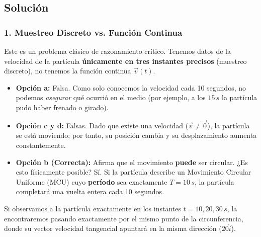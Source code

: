 \documentclass[12pt, a4paper]{article}
\begin{document}
\subsection*{Solución}

\subsubsection*{1. Muestreo Discreto vs. Función Continua}
Este es un problema clásico de razonamiento crítico. Tenemos datos de la velocidad de la partícula \textbf{únicamente en tres instantes precisos} (muestreo discreto), no tenemos la función continua $\vec{v}(t)$.

\begin{itemize}
    \item \textbf{Opción a:} Falsa. Como solo conocemos la velocidad cada 10 segundos, no podemos \textit{asegurar} qué ocurrió en el medio (por ejemplo, a los $15\,\si{s}$ la partícula pudo haber frenado o girado).
    \item \textbf{Opción c y d:} Falsas. Dado que existe una velocidad ($\vec{v} \neq \vec{0}$), la partícula se está moviendo; por tanto, su posición cambia y su desplazamiento aumenta constantemente.
    \item \textbf{Opción b (Correcta):} Afirma que el movimiento \textbf{puede} ser circular. ¿Es esto físicamente posible? Sí. Si la partícula describe un Movimiento Circular Uniforme (MCU) cuyo \textbf{período} sea exactamente $T = 10\,\si{s}$, la partícula completará una vuelta entera cada 10 segundos. 
\end{itemize}

Si observamos a la partícula exactamente en los instantes $t=10, 20, 30\,\si{s}$, la encontraremos pasando exactamente por el mismo punto de la circunferencia, donde su vector velocidad tangencial apuntará en la misma dirección ($20 \hat{i}$).
\end{document}
